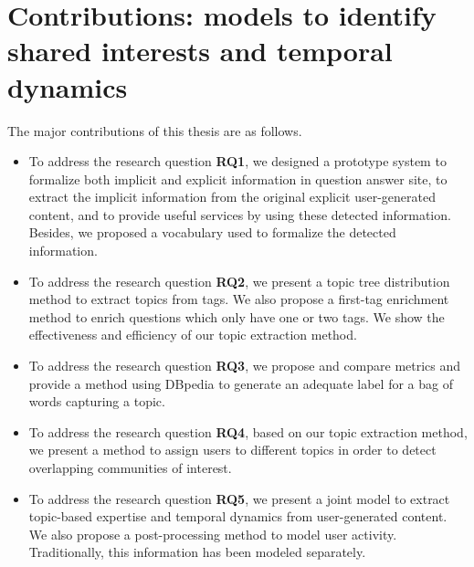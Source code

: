 \section{Contributions: models to identify shared interests and temporal dynamics}
The major contributions of this thesis are as follows.
\begin{itemize}
\item{To address the research question \textbf{RQ1}, we designed a prototype system to formalize both implicit and explicit information in question answer site, to extract the implicit information from the original explicit user-generated content, and to provide useful services by using these detected information. Besides, we proposed a vocabulary used to formalize the detected information.}

\item{To address the research question \textbf{RQ2}, we present a topic tree distribution method to extract topics from tags. We also propose a first-tag enrichment method to enrich questions which only have one or two tags. We show the effectiveness and efficiency of our topic extraction method.}

\item{To address the research question \textbf{RQ3}, we propose and compare metrics and provide a method using DBpedia to generate an adequate label for a bag of words capturing a topic.}

\item{To address the research question \textbf{RQ4}, based on our topic extraction method, we present a method to assign users to different topics in order to detect overlapping communities of interest.}

\item{To address the research question \textbf{RQ5}, we present a joint model to extract topic-based expertise and temporal dynamics from user-generated content. We also propose a post-processing method to model user activity. Traditionally, this information has been modeled separately.}

\end{itemize}



